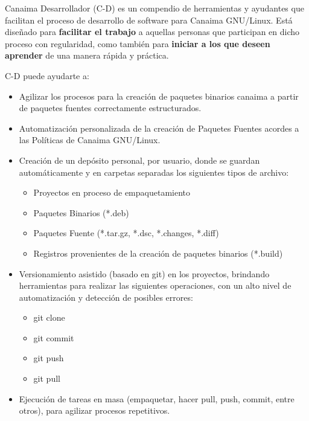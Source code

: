 \documentclass[letterpaper,12pt,spanish]{manual}
\begin{document}
Canaima Desarrollador (C-D) es un compendio de herramientas y ayudantes que facilitan el proceso de desarrollo de software para Canaima GNU/Linux. Está diseñado para \textbf{facilitar el trabajo} a aquellas personas que participan en dicho proceso con regularidad, como también para \textbf{iniciar a los que deseen aprender} de una manera rápida y práctica.

C-D puede ayudarte a:
\begin{itemize}
\item {} 
Agilizar los procesos para la creación de paquetes binarios canaima a partir de paquetes fuentes correctamente estructurados.

\item {} 
Automatización personalizada de la creación de Paquetes Fuentes acordes a las Políticas de Canaima GNU/Linux.

\item {} 
Creación de un depósito personal, por usuario, donde se guardan automáticamente y en carpetas separadas los siguientes tipos de archivo:
\begin{itemize}
\item {} 
Proyectos en proceso de empaquetamiento

\item {} 
Paquetes Binarios (*.deb)

\item {} 
Paquetes Fuente (*.tar.gz, *.dsc, *.changes, *.diff)

\item {} 
Registros provenientes de la creación de paquetes binarios (*.build)

\end{itemize}

\item {} 
Versionamiento asistido (basado en git) en los proyectos, brindando herramientas para realizar las siguientes operaciones, con un alto nivel de automatización y detección de posibles errores:
\begin{itemize}
\item {} 
git clone

\item {} 
git commit

\item {} 
git push

\item {} 
git pull

\end{itemize}

\item {} 
Ejecución de tareas en masa (empaquetar, hacer pull, push, commit, entre otros), para agilizar procesos repetitivos.

\end{itemize}
\end{document}
